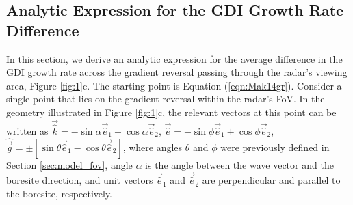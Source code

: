 \begin{subappendices}
\section{Analytic Expression for the GDI Growth Rate Difference}
\label{sec:p2appendix}


In this section, we derive an analytic expression for the average difference in the GDI growth rate across the gradient reversal passing through the radar's viewing area, Figure \ref{fig:1}c. The starting point is Equation (\ref{eqn:Mak14gr}). Consider a single point that lies on the gradient reversal within the radar's FoV. In the geometry illustrated in Figure \ref{fig:1}c, the relevant vectors at this point can be written as \(\vec{\hat k}=-\sin\alpha\vec{\hat{e}}_1-\cos\alpha\vec{\hat{e}}_2\), \(\vec{\hat e}=-\sin\phi\vec{\hat{e}}_1+\cos\phi\vec{\hat{e}}_2\), \(\hat{\vec{g}}=\pm[\sin\theta\vec{\hat{e}}_1-\cos\theta\vec{\hat{e}}_2]\), where angles \(\theta\) and \(\phi\) were previously defined in Section \ref{sec:model_fov}, angle \(\alpha\) is the angle between the wave vector and the boresite direction, and unit vectors \(\vec{\hat{e}}_1\)  and \(\vec{\hat{e}}_2\) are  perpendicular and parallel to the boresite, respectively.



\end{subappendices}
